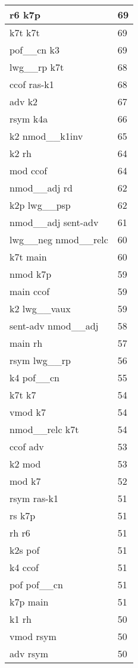 \documentclass[a4 paper]{article}
\begin{document}
\begin{longtable}{p{}p{}}
r6 k7p  & 69 \\ \midrule
k7t k7t  & 69 \\ \midrule
pof\_\_cn k3  & 69 \\ \midrule
lwg\_\_rp k7t  & 68 \\ \midrule
ccof ras-k1  & 68 \\ \midrule
adv k2  & 67 \\ \midrule
rsym k4a  & 66 \\ \midrule
k2 nmod\_\_k1inv  & 65 \\ \midrule
k2 rh  & 64 \\ \midrule
mod ccof  & 64 \\ \midrule
nmod\_\_adj rd  & 62 \\ \midrule
k2p lwg\_\_psp  & 62 \\ \midrule
nmod\_\_adj sent-adv  & 61 \\ \midrule
lwg\_\_neg nmod\_\_relc  & 60 \\ \midrule
k7t main  & 60 \\ \midrule
nmod k7p  & 59 \\ \midrule
main ccof  & 59 \\ \midrule
k2 lwg\_\_vaux  & 59 \\ \midrule
sent-adv nmod\_\_adj  & 58 \\ \midrule
main rh  & 57 \\ \midrule
rsym lwg\_\_rp  & 56 \\ \midrule
k4 pof\_\_cn  & 55 \\ \midrule
k7t k7  & 54 \\ \midrule
vmod k7  & 54 \\ \midrule
nmod\_\_relc k7t  & 54 \\ \midrule
ccof adv  & 53 \\ \midrule
k2 mod  & 53 \\ \midrule
mod k7  & 52 \\ \midrule
rsym ras-k1  & 51 \\ \midrule
rs k7p  & 51 \\ \midrule
rh r6  & 51 \\ \midrule
k2s pof  & 51 \\ \midrule
k4 ccof  & 51 \\ \midrule
pof pof\_\_cn  & 51 \\ \midrule
k7p main  & 51 \\ \midrule
k1 rh  & 50 \\ \midrule
vmod rsym  & 50 \\ \midrule
adv rsym  & 50 \\ \midrule

\end{longtable}
\end{document}
